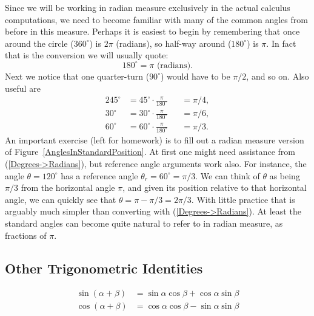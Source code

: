 Since we will be working in radian measure exclusively 
in the actual calculus computations, we need to become 
familiar with many of the common angles from before in this
measure.  Perhaps it is easiest to begin by remembering that
once around the circle ($360^\circ$) is $2\pi$ (radians),
so half-way around ($180^\circ$) is $\pi$.  In fact that
is the conversion we will usually quote:
\begin{equation}
180^\circ=\pi\text{ (radians)}.\label{Degrees->Radians}\end{equation}
Next we notice that one quarter-turn ($90^\circ$) would
have to be $\pi/2$, and so on.  Also useful are
\begin{alignat*}{2}
45^\circ&=45^\circ\cdot\frac{\pi}{180^\circ}&&=\pi/4,\\
30^\circ&=30^\circ\cdot\frac{\pi}{180^\circ}&&=\pi/6,\\
60^\circ&=60^\circ\cdot\frac{\pi}{180^\circ}&&=\pi/3.
\end{alignat*}
An important exercise (left for homework) is to fill out
a radian measure version of Figure~\ref{AnglesInStandardPosition}.
At first one might need assistance from (\ref{Degrees->Radians}),
but reference angle arguments work also.  For instance,
the angle $\theta=120^\circ$ has a reference angle 
$\theta_r=60^\circ=\pi/3$.  We can think of $\theta$ as being
$\pi/3$ from the horizontal angle $\pi$, and given its
position relative to that horizontal angle, we can
quickly see that $\theta=\pi-\pi/3=2\pi/3$. With little
practice that is arguably much simpler than converting
with  (\ref{Degrees->Radians}).
At least the standard angles can become quite natural to 
refer to in radian measure, as fractions of $\pi$.

\subsection{Other Trigonometric Identities}

\begin{align}
\sin(\alpha+\beta)&=\sin\alpha\cos\beta+\cos\alpha\sin\beta
\label{Sin(Alpha+Beta)}\\
\cos(\alpha+\beta)&=\cos\alpha\cos\beta-\sin\alpha\sin\beta
\label{Cos(Alpha+Beta)}
\end{align}




















